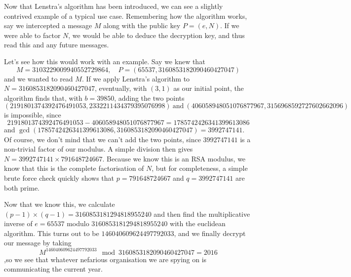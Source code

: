 
Now that Lenstra's algorithm has been introduced, we can see a slightly contrived example of a typical use case. Remembering how the algorithm works, say we intercepted a message $M$ along with the public key $P = (e,N)$. If we were able to factor $N$, we would be able to deduce the decryption key, and thus read this and any future messages. 

Let's see how this would work with an example. Say we knew that
$$ M = 3103229009940552729864,\quad P = (65537, 3160853182090460427047) $$
and we wanted to read $M$. If we apply Lenstra's algorithm to $N = 3160853182090460427047$, eventually, with $(3,1)$ as our initial point, the algorithm finds that, with $b = 39850$, adding the two points
$$(2191801374392476491053, 2332211434379395076998)\ \text{and}\ (406058948051076877967, 3156968592727602662096)$$
is impossible, since 
$$2191801374392476491053-406058948051076877967 = 1785742426341399613086$$ and $\gcd(1785742426341399613086, 3160853182090460427047) = 3992747141$. Of course, we don't mind that we can't add the two points, since $3992747141$ is a non-trivial factor of our modulus. A simple division then gives $N = 3992747141 \times 791648724667$. Because we know this is an RSA modulus, we know that this is the complete factorisation of $N$, but for completeness, a simple brute force check quickly shows that $p = 791648724667$ and $q = 3992747141$ are both prime.

Now that we know this, we calculate $(p-1) \times (q-1) = 3160853181294818955240$ and then find the multiplicative inverse of $e = 65537$ modulo $3160853181294818955240$ with the euclidean algorithm. This turns out to be $146040609624497792033$, and we finally decrypt our message by taking
$$ M^{146040609624497792033} \mod 3160853182090460427047 =2016 $$
,so we see that whatever nefarious organisation we are spying on is communicating the current year.
